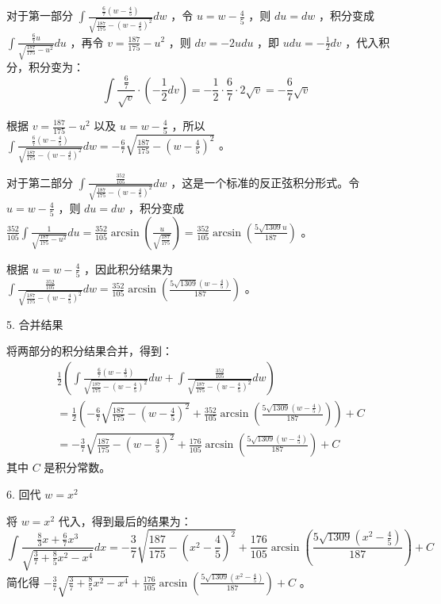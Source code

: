 对于第一部分 $\int \frac{\frac{6}{7}(w-\frac{4}{5})}{\sqrt{\frac{187}{175}-(w-\frac{4}{5})^2}} d w$ ，令 $u=w-\frac{4}{5}$ ，则 $d u=d w$ ，积分变成 $\int \frac{\frac{6}{7}u}{\sqrt{\frac{187}{175}-u^2}} d u$ ，再令 $v=\frac{187}{175}-u^2$ ，则 $d v=-2u d u$ ，即 $u d u=-\frac{1}{2} d v$ ，代入积分，积分变为：
$$
\int \frac{\frac{6}{7}}{\sqrt{v}} \cdot (-\frac{1}{2} d v)=-\frac{1}{2}\cdot \frac{6}{7}\cdot 2\sqrt{v}=-\frac{6}{7}\sqrt{v}
$$

根据 $v=\frac{187}{175}-u^2$ 以及 $u=w-\frac{4}{5}$ ，所以 $\int \frac{\frac{6}{7}(w-\frac{4}{5})}{\sqrt{\frac{187}{175}-(w-\frac{4}{5})^2}} d w=-\frac{6}{7}\sqrt{\frac{187}{175}-(w-\frac{4}{5})^2}$ 。

对于第二部分 $\int \frac{\frac{352}{105}}{\sqrt{\frac{187}{175}-(w-\frac{4}{5})^2}} d w$ ，这是一个标准的反正弦积分形式。令 $u=w-\frac{4}{5}$ ，则 $d u=d w$ ，积分变成 $\frac{352}{105}\int \frac{1}{\sqrt{\frac{187}{175}-u^2}} d u=\frac{352}{105}\arcsin \left(\frac{u}{\sqrt{\frac{187}{175}}}\right)=\frac{352}{105}\arcsin \left(\frac{5 \sqrt{1309} u}{187}\right)$ 。

根据 $u=w-\frac{4}{5}$ ，因此积分结果为 $\int \frac{\frac{352}{105}}{\sqrt{\frac{187}{175}-(w-\frac{4}{5})^2}} d w=\frac{352}{105}\arcsin \left(\frac{5 \sqrt{1309} \left(w - \frac{4}{5}\right)}{187}\right)$ 。

5. 合并结果

将两部分的积分结果合并，得到：
$$
\begin{aligned}
&\frac{1}{2}\left(\int \frac{\frac{6}{7}(w-\frac{4}{5})}{\sqrt{\frac{187}{175}-(w-\frac{4}{5})^2}} d w+\int \frac{\frac{352}{105}}{\sqrt{\frac{187}{175}-(w-\frac{4}{5})^2}} d w\right)\\
&=\frac{1}{2}\left(-\frac{6}{7}\sqrt{\frac{187}{175}-(w-\frac{4}{5})^2}+\frac{352}{105}\arcsin \left(\frac{5 \sqrt{1309} \left(w - \frac{4}{5}\right)}{187}\right)\right)+C\\
&=- \frac{3}{7}\sqrt{\frac{187}{175}-(w-\frac{4}{5})^2}+\frac{176}{105}\arcsin \left(\frac{5 \sqrt{1309} \left(w - \frac{4}{5}\right)}{187}\right)+C
\end{aligned}
$$
其中 $C$ 是积分常数。

6. 回代 $w=x^2$

将 $w=x^2$ 代入，得到最后的结果为：
$$
\int \frac{\frac{8}{3}x+\frac{6}{7}x^3}{\sqrt{\frac{3}{7}+\frac{8}{5}x^2-x^4}} d x=- \frac{3}{7}\sqrt{\frac{187}{175}-(x^2-\frac{4}{5})^2}+\frac{176}{105}\arcsin \left(\frac{5 \sqrt{1309} \left(x^{2} - \frac{4}{5}\right)}{187}\right)+C
$$
简化得 $- \frac{3}{7}\sqrt{\frac{3}{7}+\frac{8}{5}x^2-x^4}+\frac{176}{105}\arcsin \left(\frac{5 \sqrt{1309} \left(x^{2} - \frac{4}{5}\right)}{187}\right)+C$ 。
